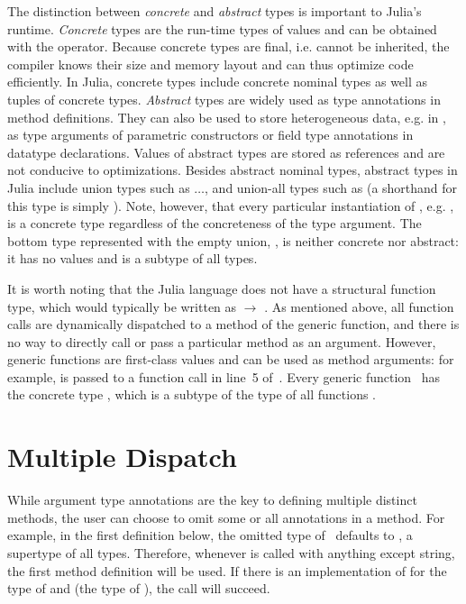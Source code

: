The distinction between \emph{concrete} and \emph{abstract} types
is important to Julia's runtime.
\emph{Concrete} types are the run-time types of values and can be
obtained with the  operator. Because concrete types are final, 
i.e. cannot be inherited, the compiler knows their size and memory layout
and can thus optimize code efficiently.
In Julia, concrete types include concrete nominal types as well as
tuples of concrete types.
\emph{Abstract} types are widely used as type annotations in method definitions.
They can also be used to store heterogeneous data, e.g. in ,
as type arguments of parametric constructors 
or field type annotations in datatype declarations.
Values of abstract types are stored as references and are not conducive
to optimizations.
Besides abstract nominal types, abstract types in Julia include union types
such as $\ldots$, and union-all types
such as  (a shorthand for this type 
is simply ). Note, however, that every particular instantiation of
, e.g. , is a concrete type
regardless of the concreteness of the type argument.
The bottom type represented with the empty union, , is neither
concrete nor abstract: it has no values and is a subtype of all types.

It is worth noting that the Julia language does not have a structural function type,
which would typically be written as  $\rightarrow$ . As mentioned above,
all function calls are dynamically dispatched to a method of the generic
function, and there is no way to directly call or
pass a particular method as an argument.
However, generic functions are first-class values and can be used as
method arguments: for example, \cjl{(-)} is passed to a function call in line~5
of~.
Every generic function~ has the concrete type ,
which is a subtype of the type of all functions .



\section{Multiple Dispatch}\label{sec:background:dispatch}

While argument type annotations are the key to defining multiple distinct
methods, the user can choose to omit some or all annotations in a method.
For example, in the first  definition below, the omitted type
of~ defaults to , a supertype of all types.
Therefore, whenever  is called with anything except string,
the first method definition will be used. If there is an implementation
of \cjl{(-)} for the type of  and  (the type of ),
the  call will succeed. 

